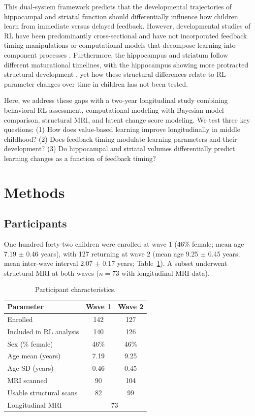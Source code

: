 \documentclass[12pt]{article}
\begin{document}
This dual-system framework predicts that the developmental trajectories of hippocampal and striatal function should differentially influence how children learn from immediate versus delayed feedback. However, developmental studies of RL have been predominantly cross-sectional and have not incorporated feedback timing manipulations or computational models that decompose learning into component processes \citep{palminteri2016computational}. Furthermore, the hippocampus and striatum follow different maturational timelines, with the hippocampus showing more protracted structural development \citep{goddings2014puberty}, yet how these structural differences relate to RL parameter changes over time in children has not been tested.

Here, we address these gaps with a two-year longitudinal study combining behavioral RL assessment, computational modeling with Bayesian model comparison, structural MRI, and latent change score modeling. We test three key questions: (1) How does value-based learning improve longitudinally in middle childhood? (2) Does feedback timing modulate learning parameters and their development? (3) Do hippocampal and striatal volumes differentially predict learning changes as a function of feedback timing?

\section{Methods}

\subsection{Participants}

One hundred forty-two children were enrolled at wave 1 (46\% female; mean age 7.19 $\pm$ 0.46 years), with 127 returning at wave 2 (mean age 9.25 $\pm$ 0.45 years; mean inter-wave interval 2.07 $\pm$ 0.17 years; Table~\ref{tab:participants}). A subset underwent structural MRI at both waves ($n = 73$ with longitudinal MRI data).

\begin{table}[htbp]
\centering
\caption{Participant characteristics.}
\label{tab:participants}
\begin{tabular}{lcc}
\toprule
Parameter & Wave 1 & Wave 2 \\
\midrule
Enrolled & 142 & 127 \\
Included in RL analysis & 140 & 126 \\
Sex (\% female) & 46\% & 46\% \\
Age mean (years) & 7.19 & 9.25 \\
Age SD (years) & 0.46 & 0.45 \\
MRI scanned & 90 & 104 \\
Usable structural scans & 82 & 99 \\
Longitudinal MRI & \multicolumn{2}{c}{73} \\
\bottomrule
\end{tabular}
\end{table}
\end{document}
